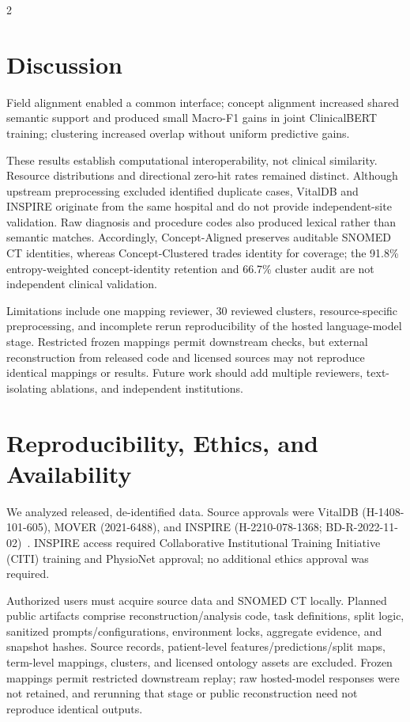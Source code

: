 \documentclass[a4paper,conference]{IEEEtran}
\newcommand{\conceptaligned}{Concept-Aligned}
\newcommand{\conceptclustered}{Concept-Clustered}
\begin{document}
\begin{multicols}{2}
\section{Discussion}
Field alignment enabled a common interface; concept alignment increased shared semantic support and produced small Macro-F1 gains in joint ClinicalBERT training; clustering increased overlap without uniform predictive gains.

These results establish computational interoperability, not clinical similarity. Resource distributions and directional zero-hit rates remained distinct. Although upstream preprocessing excluded identified duplicate cases, VitalDB and INSPIRE originate from the same hospital and do not provide independent-site validation. Raw diagnosis and procedure codes also produced lexical rather than semantic matches. Accordingly, \conceptaligned{} preserves auditable SNOMED CT identities, whereas \conceptclustered{} trades identity for coverage; the 91.8\% entropy-weighted concept-identity retention and 66.7\% cluster audit are not independent clinical validation.

Limitations include one mapping reviewer, 30 reviewed clusters, resource-specific preprocessing, and incomplete rerun reproducibility of the hosted language-model stage. Restricted frozen mappings permit downstream checks, but external reconstruction from released code and licensed sources may not reproduce identical mappings or results. Future work should add multiple reviewers, text-isolating ablations, and independent institutions.

\section{Reproducibility, Ethics, and Availability}
We analyzed released, de-identified data. Source approvals were VitalDB (H-1408-101-605), MOVER (2021-6488), and INSPIRE (H-2210-078-1368; BD-R-2022-11-02)~\cite{vitaldb,mover,inspire}. INSPIRE access required Collaborative Institutional Training Initiative (CITI) training and PhysioNet approval; no additional ethics approval was required.

Authorized users must acquire source data and SNOMED CT locally. Planned public artifacts comprise reconstruction/analysis code, task definitions, split logic, sanitized prompts/configurations, environment locks, aggregate evidence, and snapshot hashes. Source records, patient-level features/predictions/split maps, term-level mappings, clusters, and licensed ontology assets are excluded. Frozen mappings permit restricted downstream replay; raw hosted-model responses were not retained, and rerunning that stage or public reconstruction need not reproduce identical outputs.


\end{multicols}
\end{document}
